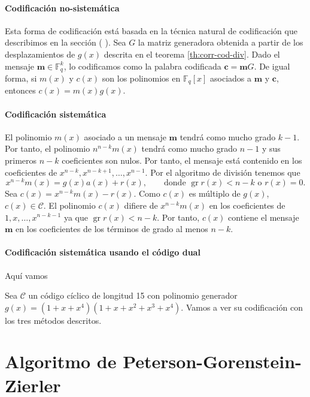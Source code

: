 \paragraph{Codificación no-sistemática}

Esta forma de codificación está basada en la técnica natural de codificación que describimos en la sección (
).
Sea \(G\) la matriz generadora obtenida a partir de los desplazamientos de \(g(x)\) descrita en el teorema \ref{th:corr-cod-div}.
Dado el mensaje \(\mathbf m \in \mathbb F_q^k\), lo codificamos como la palabra codificada \(\mathbf c = \mathbf mG\).
De igual forma, si \(m(x)\) y \(c(x)\) son los polinomios en \(\mathbb F_q[x]\) asociados a \(\mathbf{m}\) y \(\mathbf c\), entonces \(c(x) = m(x)g(x)\).

\paragraph{Codificación sistemática}

El polinomio \(m(x)\) asociado a un mensaje \(\mathbf m\) tendrá como mucho grado \(k -1\).
Por tanto, el polinomio \(n^{n-k}m(x)\) tendrá como mucho grado \(n - 1\) y sus primeros \( n - k\) coeficientes son nulos.
Por tanto, el mensaje está contenido en los coeficientes de \(x^{n-k}, x^{n-k+1}, \dots, x^{n-1}\).
Por el algoritmo de división tenemos que
\[x^{n-k}m(x) = g(x)a(x) + r(x), \qquad \text{donde } \operatorname{gr} r(x) < n - k \text{ o } r(x) = 0.\]
Sea \(c(x) = x^{n-k}m(x) - r(x)\).
Como \(c(x)\) es múltiplo de \(g(x)\), \(c(x) \in \mathcal C\).
El polinomio \(c(x)\) difiere de \(x^{n-k}m(x)\) en los coeficientes de \(1, x, \dots, x^{n-k-1}\) ya que \(\operatorname{gr} r(x) < n-k\).
Por tanto, \(c(x)\) contiene el mensaje \(\mathbf m\) en los coeficientes de los términos de grado al menos \(n - k\).

\paragraph{Codificación sistemática usando el código dual}

Aquí vamos

\begin{example}
  Sea \(\mathcal C\) un código cíclico de longitud 15 con polinomio generador \(g(x) = (1 + x + x^4)(1 + x + x^2 + x^3 + x^4)\). Vamos a ver su codificación con los tres métodos descritos.
\end{example}

\section{Algoritmo de Peterson-Gorenstein-Zierler}